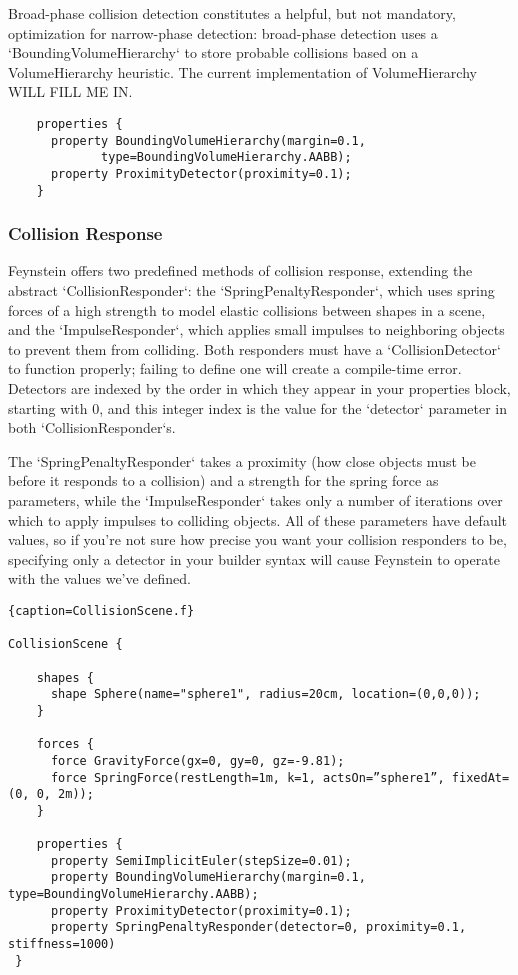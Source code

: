 Broad-phase collision detection constitutes a helpful, but not mandatory, optimization for narrow-phase detection: broad-phase detection uses a `BoundingVolumeHierarchy` to store probable collisions based on a VolumeHierarchy heuristic. The current implementation of VolumeHierarchy WILL FILL ME IN.

\begin{lstlisting}
    properties {
      property BoundingVolumeHierarchy(margin=0.1, 
             type=BoundingVolumeHierarchy.AABB);
      property ProximityDetector(proximity=0.1);
    }
\end{lstlisting}

\subsubsection{Collision Response}

Feynstein offers two predefined methods of collision response, extending the abstract `CollisionResponder`: the `SpringPenaltyResponder`, which uses spring forces of a high strength to model elastic collisions between shapes in a scene, and the `ImpulseResponder`, which applies small impulses to neighboring objects to prevent them from colliding. Both responders must have a `CollisionDetector` to function properly; failing to define one will create a compile-time error. Detectors are indexed by the order in which they appear in your properties block, starting with 0, and this integer index is the value for the `detector` parameter in both `CollisionResponder`s.

The `SpringPenaltyResponder` takes a proximity (how close objects must be before it responds to a collision) and a strength for the spring force as parameters, while the `ImpulseResponder` takes only a number of iterations over which to apply impulses to colliding objects. All of these parameters have default values, so if you're not sure how precise you want your collision responders to be, specifying only a detector in your builder syntax will cause Feynstein to operate with the values we've defined.

\begin{lstlisting}{caption=CollisionScene.f}

CollisionScene {

    shapes {
      shape Sphere(name="sphere1", radius=20cm, location=(0,0,0));
    }

    forces {
      force GravityForce(gx=0, gy=0, gz=-9.81);
      force SpringForce(restLength=1m, k=1, actsOn=”sphere1”, fixedAt=(0, 0, 2m));
    }

    properties {
      property SemiImplicitEuler(stepSize=0.01);
      property BoundingVolumeHierarchy(margin=0.1, type=BoundingVolumeHierarchy.AABB);
      property ProximityDetector(proximity=0.1);
      property SpringPenaltyResponder(detector=0, proximity=0.1, stiffness=1000)
 }
\end{lstlisting}
